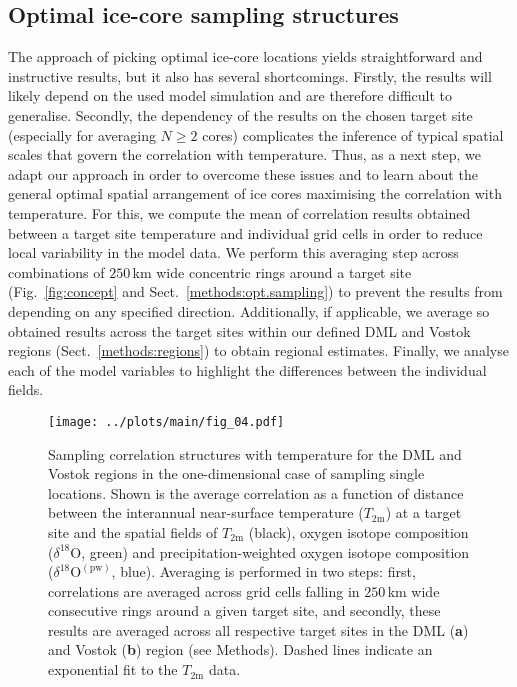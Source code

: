 \documentclass[cp, manuscript]{copernicus}
\begin{document}
\subsection{Optimal ice-core sampling structures}
\label{results:optim-spacing}

The approach of picking optimal ice-core locations yields straightforward and
instructive results, but it also has several shortcomings. Firstly, the results
will likely depend on the used model simulation and are therefore difficult to
generalise. Secondly, the dependency of the results on the chosen target site
(especially for averaging $N\ge2$ cores) complicates the inference of typical
spatial scales that govern the correlation with temperature. Thus, as a next
step, we adapt our approach in order to overcome these issues and to learn about
the general optimal spatial arrangement of ice cores maximising the correlation
with temperature. For this, we compute the mean of correlation results obtained
between a target site temperature and individual grid cells in order to reduce
local variability in the model data. We perform this averaging step across
combinations of $250$\,km wide concentric rings around a target site
(Fig.~\ref{fig:concept} and Sect.~\ref{methods:opt.sampling}) to prevent the
results from depending on any specified direction. Additionally, if applicable,
we average so obtained results across the target sites within our defined DML
and Vostok regions (Sect.~\ref{methods:regions}) to obtain regional
estimates. Finally, we analyse each of the model variables to highlight the
differences between the individual fields.

\begin{figure*}[t]%
\centering
\texttt{[image: ../plots/main/fig\_04.pdf]}
\caption{%
  Sampling correlation structures with temperature for the DML and Vostok
  regions in the one-dimensional case of sampling single locations. Shown is the
  average correlation as a function of distance between the interannual
  near-surface temperature ($T_{2\mathrm{m}}$) at a target site and the spatial
  fields of $T_{2\mathrm{m}}$ (black), oxygen isotope composition
  ($\delta^{18}\mathrm{O}$, green) and precipitation-weighted oxygen isotope
  composition ($\delta^{18}\mathrm{O}^{\mathrm{(pw)}}$, blue). Averaging is
  performed in two steps: first, correlations are averaged across grid cells
  falling in $250$\,km wide consecutive rings around a given target site, and
  secondly, these results are averaged across all respective target sites in the
  DML (\textbf{a}) and Vostok (\textbf{b}) region (see Methods). Dashed lines
  indicate an exponential fit to the $T_{2\mathrm{m}}$ data.}
\label{fig:avg.cor.structure}%
\end{figure*}%
\end{document}
